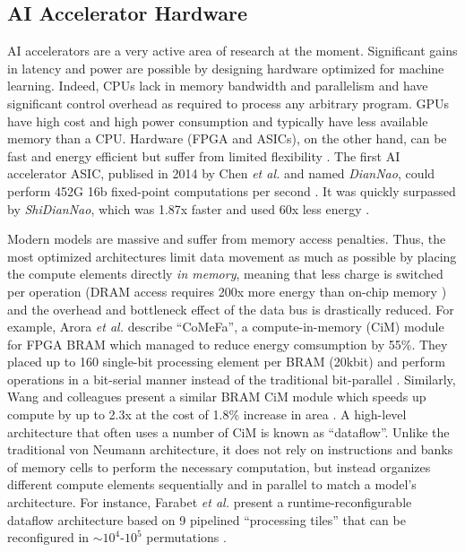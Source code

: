 \subsection{AI Accelerator Hardware}
AI accelerators are a very active area of research at the moment. Significant gains in latency and power are possible by designing hardware optimized for machine learning. Indeed, CPUs lack in memory bandwidth and parallelism and have significant control overhead
as required to process any arbitrary program. GPUs have high cost and high power consumption and typically have less available memory than a CPU. Hardware (FPGA and ASICs), on the other hand, can be fast and energy efficient but suffer from limited flexibility \cite{hu2022survey}.
The first AI accelerator ASIC, publised in 2014 by Chen \textit{et al.} and named \textit{DianNao}, could perform 452G 16b fixed-point computations per second \cite{chen2014diannao}. It was quickly surpassed by \textit{ShiDianNao}, which was 1.87x faster and used 60x less
energy \cite{du2015shidiannao}.

Modern models are massive and suffer from memory access penalties. Thus, the most optimized architectures limit data movement as much as possible by placing the compute elements directly \textit{in memory}, meaning that less charge is switched per operation
(DRAM access requires 200x more energy than on-chip memory \cite*{ding2017circnn}) and the overhead and bottleneck effect of the data bus is drastically reduced. For example, Arora \textit{et al.} describe ``CoMeFa'', a compute-in-memory (CiM) module
for FPGA BRAM which managed to reduce energy comsumption by 55\%. They placed up to 160 single-bit processing element per BRAM (20kbit) and perform operations in a bit-serial manner instead of the traditional bit-parallel \cite*{arora2022comefa}. Similarly, 
Wang and colleagues present a similar BRAM CiM module which speeds up compute by up to 2.3x at the cost of 1.8\% increase in area \cite*{wang2021compute}. A high-level architecture that often uses a number of CiM is known as ``dataflow''. Unlike the traditional
von Neumann architecture, it does not rely on instructions and banks of memory cells to perform the necessary computation, but instead organizes different compute elements sequentially and in parallel to match a model's architecture. For instance, Farabet 
\textit{et al.} present a runtime-reconfigurable dataflow architecture based on 9 pipelined ``processing tiles'' that can be reconfigured in $\sim$$10^4$-$10^5$ permutations \cite{farabetlargescale}.

